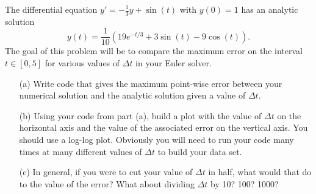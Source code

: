 \begin{problem}\label{prob:ode_error_analysis}
    The differential equation $y' = -\frac{1}{3}y + \sin(t)$ with $y(0) = 1$ has an
    analytic solution 
    \[ y(t) = \frac{1}{10} \left( 19 e^{-t/3} + 3\sin(t) - 9\cos(t) \right). \]
    The goal of this problem will be to compare the maximum error on the interval $t \in
    [0,5]$ for various values of $\Delta t$ in your Euler solver.
    \begin{enumerate}
        \item[(a)] Write code that gives the maximum point-wise error between your
            numerical solution and the analytic solution given a value of $\Delta t$.
        \item[(b)] Using your code from part (a), build a plot with the value of $\Delta
            t$ on the horizontal axis and the value of the associated error on the
            vertical axis.  You should use a log-log plot.  Obviously you will need to run
            your code many times at many different values of $\Delta t$ to build your data
            set.
        \item[(c)] In general, if you were to cut your value of $\Delta t$ in half, what
            would that do to the value of the error?  What about dividing $\Delta t$ by
            10?  100?  1000?
    \end{enumerate}
\end{problem}


